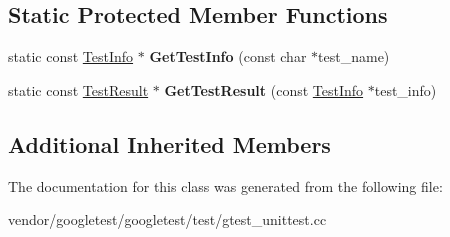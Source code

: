 \subsection*{Static Protected Member Functions}
\begin{DoxyCompactItemize}
\item 
\mbox{\label{classtesting_1_1_test_info_test_a4140c1302bf53c7f1375a23923624f04}} 
static const \mbox{\hyperlink{classtesting_1_1_test_info}{Test\+Info}} $\ast$ {\bfseries Get\+Test\+Info} (const char $\ast$test\+\_\+name)
\item 
\mbox{\label{classtesting_1_1_test_info_test_a154b3679b1aa00ad037ce46eb60d18c3}} 
static const \mbox{\hyperlink{classtesting_1_1_test_result}{Test\+Result}} $\ast$ {\bfseries Get\+Test\+Result} (const \mbox{\hyperlink{classtesting_1_1_test_info}{Test\+Info}} $\ast$test\+\_\+info)
\end{DoxyCompactItemize}
\subsection*{Additional Inherited Members}


The documentation for this class was generated from the following file\+:\begin{DoxyCompactItemize}
\item 
vendor/googletest/googletest/test/gtest\+\_\+unittest.\+cc\end{DoxyCompactItemize}
